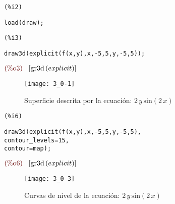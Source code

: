 \documentclass[12pt]{article}
\begin{document}
\noindent
\begin{minipage}[t]{8ex}{\color{red}\bf
\begin{verbatim}
(%i2) 
\end{verbatim}}
\end{minipage}
\begin{minipage}[t]{\textwidth}{\color{blue}
\begin{verbatim}
load(draw);
\end{verbatim}}
\end{minipage}

\noindent
\begin{minipage}[t]{8ex}{\color{red}\bf
\begin{verbatim}
(%i3) 
\end{verbatim}}
\end{minipage}
\begin{minipage}[t]{\textwidth}{\color{blue}
\begin{verbatim}
draw3d(explicit(f(x,y),x,-5,5,y,-5,5));
\end{verbatim}}
\end{minipage}
\begin{math}\displaystyle
\parbox{8ex}{\color{labelcolor}(\%o3) }
[\mathrm{gr3d}\left( explicit\right) ]
\end{math}
\begin{figure}[H]
\centering
\texttt{[image: 3\_0-1]}
\caption{Superficie descrita por la ecuación: $2\,y\,\mathrm{sin}\left( 2\,x\right)$}
\end{figure}

\noindent
\begin{minipage}[t]{8ex}{\color{red}\bf
\begin{verbatim}
(%i6) 
\end{verbatim}}
\end{minipage}
\begin{minipage}[t]{\textwidth}{\color{blue}
\begin{verbatim}
draw3d(explicit(f(x,y),x,-5,5,y,-5,5),
contour_levels=15,
contour=map);
\end{verbatim}}
\end{minipage}
\begin{math}\displaystyle
\parbox{8ex}{\color{labelcolor}(\%o6) }
[\mathrm{gr3d}\left( explicit\right) ]
\end{math}
\begin{figure}[H]
\centering
\texttt{[image: 3\_0-3]}
\caption{Curvas de nivel de la ecuación: $2\,y\,\mathrm{sin}\left( 2\,x\right)$}
\end{figure}
\end{document}
